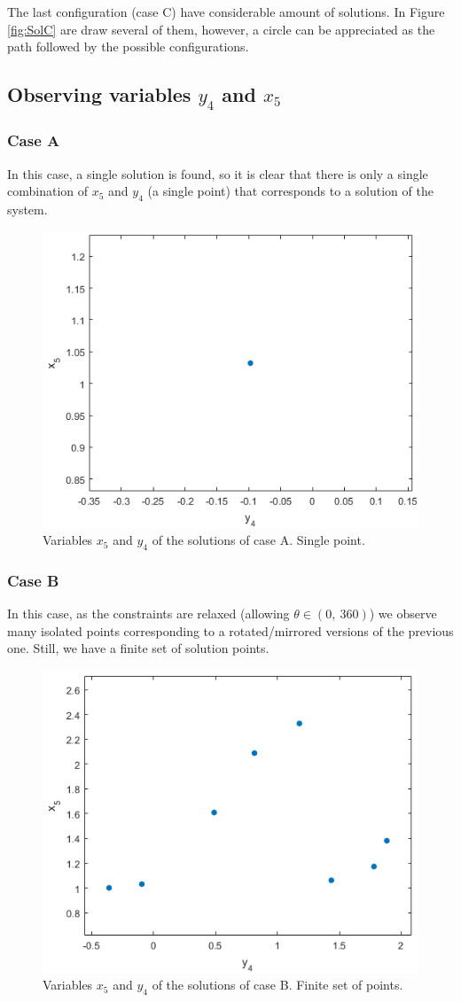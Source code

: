 \documentclass[paper=a4, fontsize=11pt]{scrartcl} %
\begin{document}
The last configuration (case C) have considerable amount of solutions. In Figure \ref{fig:SolC} are draw several of them, however, a circle can be appreciated as the path followed by the possible configurations.

\subsection*{Observing variables $y_4$ and $x_5$}

\subsubsection*{Case A}
In this case, a single solution is found, so it is clear that there is only a single combination of $x_5$ and $y_4$ (a single point) that corresponds to a solution of the system.
\begin{figure}[H]
	\begin{center}
		\includegraphics[width=0.44\linewidth]{p2D_A.png} 
	\caption{Variables $x_5$ and $y_4$ of the solutions of case A. Single point.}
	\label{fig:p2D_A}
	\end{center}
\end{figure}

\subsubsection*{Case B}
In this case, as the constraints are relaxed (allowing $\theta \in (0,\ 360)$) we observe many isolated points corresponding to a rotated/mirrored versions of the previous one. Still, we have a finite set of solution points.

\begin{figure}[H]
	\begin{center}
		\includegraphics[width=0.55\linewidth]{p2D_B.png} 
	\caption{Variables $x_5$ and $y_4$ of the solutions of case B. Finite set of points.}
	\label{fig:p2D_B}
	\end{center}
\end{figure}
\end{document}

